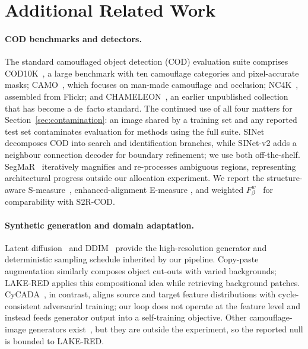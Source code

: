 \documentclass{article}
\begin{document}
\section{Additional Related Work}
\label{app:related}

\paragraph{COD benchmarks and detectors.}
The standard camouflaged object detection (COD) evaluation suite comprises COD10K~\citep{fan2022concealed}, a large benchmark
with ten camouflage categories and pixel-accurate masks; CAMO~\citep{le2019anabranch}, which focuses
on man-made camouflage and occlusion; NC4K~\citep{lv2021simultaneously}, assembled from Flickr; and
CHAMELEON~\citep{skurowski2018animal}, an earlier unpublished collection that has become a de~facto
standard. The continued use of all four matters for Section~\ref{sec:contamination}: an image shared
by a training set and any reported test set contaminates evaluation for methods using the full suite.
SINet~\citep{fan2020sinet} decomposes COD into search and identification branches, while SINet-v2
\citep{fan2022concealed} adds a neighbour connection decoder for boundary refinement; we use both
off-the-shelf. SegMaR~\citep{jia2022segment} iteratively magnifies and re-processes ambiguous
regions, representing architectural progress outside our allocation experiment. We report the
structure-aware S-measure~\citep{fan2017structure}, enhanced-alignment E-measure
\citep{fan2018enhanced}, and weighted $F_\beta^w$~\citep{margolin2014evaluate} for comparability
with S2R-COD.

\paragraph{Synthetic generation and domain adaptation.}
Latent diffusion~\citep{rombach2022high} and DDIM~\citep{song2021denoising} provide the high-resolution
generator and deterministic sampling schedule inherited by our pipeline. Copy-paste augmentation
\citep{ghiasi2021simple} similarly composes object cut-outs with varied backgrounds; LAKE-RED applies
this compositional idea while retrieving background patches. CyCADA~\citep{hoffman2018cycada}, in
contrast, aligns source and target feature distributions with cycle-consistent adversarial training;
our loop does not operate at the feature level and instead feeds generator output into a
self-training objective. Other camouflage-image generators exist~\citep{chen2025realcamo}, but they
are outside the experiment, so the reported null is bounded to LAKE-RED.
\end{document}
